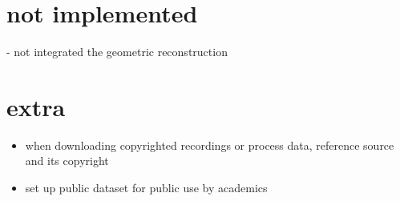 \documentclass[
11pt,
twoside
]{report}
\begin{document}
\section{not implemented}

- not integrated the geometric reconstruction


\section{extra}

\begin{itemize}
\item
  when downloading copyrighted recordings or process data, reference
  source and its copyright
\item
  set up public dataset for public use by academics
\end{itemize}


\printbibliography
\end{document}
